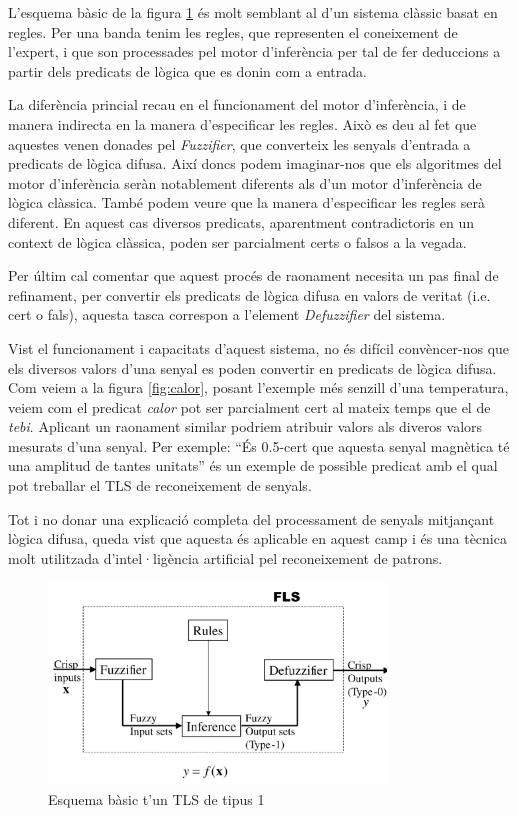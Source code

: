 \documentclass[11pt,a4paper]{article}
\begin{document}
L'esquema bàsic de la figura \ref{fig:tls-1} és molt semblant al d'un sistema clàssic basat en regles. Per una banda tenim les regles, que representen el coneixement de l'expert, i que son processades pel motor d'inferència per tal de fer deduccions a partir dels predicats de lògica que es donin com a entrada. 

La diferència princial recau en el funcionament del motor d'inferència, i de manera indirecta en la manera d'especificar les regles. Això es deu al fet que aquestes venen donades pel \emph{Fuzzifier}, que converteix les senyals d'entrada a predicats de lògica difusa. Així doncs podem imaginar-nos que els algoritmes del motor d'inferència seràn notablement diferents als d'un motor d'inferència de lògica clàssica. També podem veure que la manera d'especificar les regles serà diferent. En aquest cas diversos predicats, aparentment contradictoris en un context de lògica clàssica, poden ser parcialment certs o falsos a la vegada.

Per últim cal comentar que aquest procés de raonament necesita un pas final de refinament, per convertir els predicats de lògica difusa en valors de veritat (i.e. cert o fals), aquesta tasca correspon a l'element \emph{Defuzzifier} del sistema.

Vist el funcionament i capacitats d'aquest sistema, no és difícil convèncer-nos que els diversos valors d'una senyal es poden convertir en predicats de lògica difusa. Com veiem a la figura \ref{fig:calor}, posant l'exemple més senzill d'una temperatura, veiem com el predicat \emph{calor} pot ser parcialment cert al mateix temps que el de \emph{tebi}. Aplicant un raonament similar podriem atribuir valors als diveros valors mesurats d'una senyal. Per exemple: ``És 0.5-cert que aquesta senyal magnètica té una amplitud de tantes unitats'' és un exemple de possible predicat amb el qual pot treballar el TLS de reconeixement de senyals.

Tot i no donar una explicació completa del processament de senyals mitjançant lògica difusa, queda vist que aquesta és aplicable en aquest camp i és una tècnica molt utilitzada d'intel·ligència artificial pel reconeixement de patrons.

\begin{figure}[b]
\centering
\includegraphics[width=0.8\textwidth]{./fig/tls1.png}
\caption{Esquema bàsic t'un TLS de tipus 1}
\label{fig:tls-1}
\end{figure}
\end{document}
